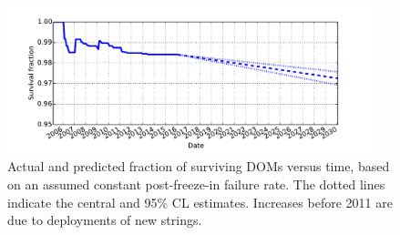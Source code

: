 \begin{figure}[!h]
 \centering
 \includegraphics[width=0.95\textwidth]{graphics/dom/reliability/dom_survival.pdf}
 \caption{Actual and predicted fraction of surviving DOMs versus time, based on an assumed
 constant post-freeze-in failure rate.  The dotted lines indicate the
 central and 95\% CL estimates.  Increases before 2011 are due
 to deployments of new strings.} 
 \label{fig:dom_survival}
\end{figure}
